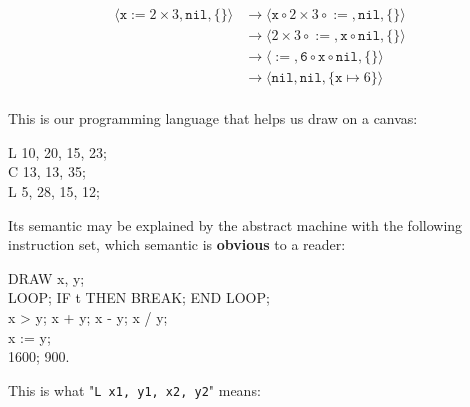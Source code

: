 \documentclass{article}
\begin{document}
\begin{equation*}
\begin{split}
\langle \texttt{x} \mathrel{\texttt{:=}} 2 \times 3, \texttt{nil}, \{\} \rangle
  & \longrightarrow \langle \texttt{x} \mathrel{\circ} 2 \times 3 \mathrel{\circ} \mathrel{\texttt{:=}}, \texttt{nil}, \{ \}\rangle \\
  & \longrightarrow \langle 2 \times 3 \mathrel{\circ} \mathrel{\texttt{:=}}, \texttt{x} \mathrel{\circ} \texttt{nil}, \{ \}\rangle \\
  & \longrightarrow \langle \mathrel{\texttt{:=}}, \texttt{6} \mathrel{\circ} \texttt{x} \mathrel{\circ} \texttt{nil}, \{ \}\rangle \\
  & \longrightarrow \langle \texttt{nil}, \texttt{nil}, \{ \texttt{x} \mapsto 6 \}\rangle \\
\end{split}
\end{equation*}

\plush{}


This is our programming language that helps us draw on a canvas:

\begin{multicols}{2}
{\ttfamily
L 10, 20, 15, 23; \\
C 13, 13, 35; \\
L 5, 28, 15, 12;}

Its semantic may be explained by the abstract machine with the following instruction set, which semantic is \textbf{obvious} to a reader:
\par\columnbreak\par
{}
\end{multicols}

{\ttfamily DRAW x, y; \\
LOOP; IF t THEN BREAK; END LOOP; \\
x > y; x + y; x - y; x / y; \\
x := y; \\
1600; 900.}

\plush{}

This is what "\texttt{L x1, y1, x2, y2}" means:
\end{document}
